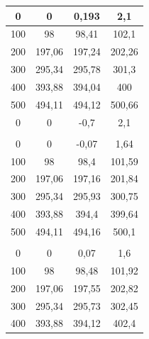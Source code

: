 \documentclass[a4paper, twoside]{article}
\begin{document}
\begin{table}[H]
{\begin{tabular}{|c|c|c|c|}
        \hline
        0 & 0 & 0,193 & 2,1 \\
        \hline
        100 & 98 & 98,41 & 102,1 \\
        \hline
        200 & 197,06 & 197,24 & 202,26 \\
        \hline
        300 & 295,34 & 295,78 & 301,3 \\
        \hline
        400 & 393,88 & 394,04 & 400 \\
        \hline
        500 & 494,11 & 494,12 & 500,66 \\
        \hline
        0 & 0 & -0,7 & 2,1 \\
        \hline
        \rowcolor{rowlight}
        \multicolumn{4}{|c|}{\textbf{Quarta serie}} \\
        \hline
        0 & 0 & -0,07 & 1,64 \\
        \hline
        100 & 98 & 98,4 & 101,59 \\
        \hline
        200 & 197,06 & 197,16 & 201,84 \\
        \hline
        300 & 295,34 & 295,93 & 300,75 \\
        \hline
        400 & 393,88 & 394,4 & 399,64 \\
        \hline
        500 & 494,11 & 494,16 & 500,1 \\
        \hline
        \rowcolor{rowlight}
        \multicolumn{4}{|c|}{\textbf{Quinta serie}} \\
        \hline
        0 & 0 & 0,07 & 1,6 \\
        \hline
        100 & 98 & 98,48 & 101,92 \\
        \hline
        200 & 197,06 & 197,55 & 202,82 \\
        \hline
        300 & 295,34 & 295,73 & 302,45 \\
        \hline
        400 & 393,88 & 394,12 & 402,4 \\
        \hline
    \end{tabular}%
    
    \hspace{0.5cm} %
    
}
\end{table}
\end{document}
